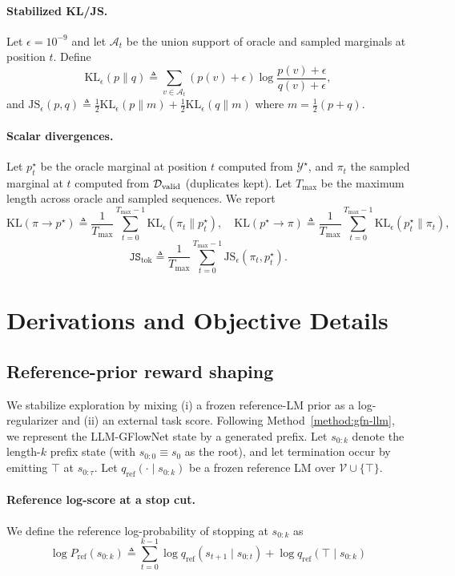 \documentclass{article}
\theoremstyle{plain}
\theoremstyle{definition}
\theoremstyle{remark}
\begin{document}
\paragraph{Stabilized KL/JS.}
Let $\epsilon=10^{-9}$ and let $\mathcal{A}_t$ be the union support of oracle and sampled marginals at position $t$.
Define
\[
\mathrm{KL}_\epsilon(p\|q)\triangleq\sum_{v\in\mathcal{A}_t}(p(v)+\epsilon)\log\frac{p(v)+\epsilon}{q(v)+\epsilon},
\]
and $\mathrm{JS}_\epsilon(p,q)\triangleq\tfrac12\mathrm{KL}_\epsilon(p\|m)+\tfrac12\mathrm{KL}_\epsilon(q\|m)$ where $m=\tfrac12(p+q)$.

\paragraph{Scalar divergences.}
Let $p^\star_t$ be the oracle marginal at position $t$ computed from $\mathcal{Y}^\star$, and $\pi_t$ the sampled marginal at $t$ computed from $\mathcal{D}_{\mathrm{valid}}$ (duplicates kept).
Let $T_{\max}$ be the maximum length across oracle and sampled sequences.
We report
\[
\mathrm{KL}(\pi\!\to\!p^\star)\triangleq\frac{1}{T_{\max}}\sum_{t=0}^{T_{\max}-1}\mathrm{KL}_\epsilon(\pi_t\|p^\star_t),\quad
\mathrm{KL}(p^\star\!\to\!\pi)\triangleq\frac{1}{T_{\max}}\sum_{t=0}^{T_{\max}-1}\mathrm{KL}_\epsilon(p^\star_t\|\pi_t),
\]
\[
\texttt{JS}_{\text{tok}}\triangleq\frac{1}{T_{\max}}\sum_{t=0}^{T_{\max}-1}\mathrm{JS}_\epsilon(\pi_t,p^\star_t).
\]

\section{Derivations and Objective Details}
\label{app:deriv}

\subsection{Reference-prior reward shaping}
\label{app:reward_shaping}

We stabilize exploration by mixing
(i) a frozen reference-LM prior as a log-regularizer and (ii) an external task score. Following Method~\ref{method:gfn-llm}, we represent the LLM-GFlowNet state by a generated prefix.
Let $s_{0:k}$ denote the length-$k$ prefix state (with $s_{0:0}\equiv s_0$ as the root), and let termination occur by emitting $\top$ at $s_{0:\tau}$.
Let $q_{\mathrm{ref}}(\cdot\mid s_{0:k})$ be a frozen reference LM over $\mathcal{V}\cup\{\top\}$.

\paragraph{Reference log-score at a stop cut.}
We define the reference log-probability of stopping at $s_{0:k}$ as
\begin{equation}
\label{eq:app_ref_logP}
\log P_{\mathrm{ref}}(s_{0:k})
\triangleq \sum_{t=0}^{k-1}\log q_{\mathrm{ref}}(s_{t+1}\mid s_{0:t}) + \log q_{\mathrm{ref}}(\top\mid s_{0:k})
\end{equation}
\end{document}
